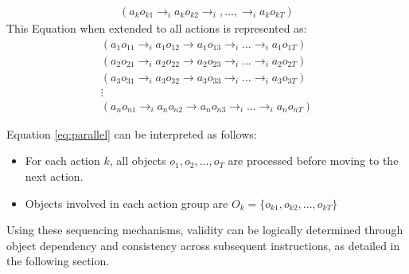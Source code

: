 \documentclass[a4paper,11pt]{lmcs}
\begin{document}
\begin{eqnarray}
 \label{eq:parallel_single}
 (a_ko_{k1} \rightarrow_i a_ko_{k2} \rightarrow_i,...,\rightarrow_i a_ko_{kT})
\end{eqnarray}
This Equation when extended to all actions is represented as:
\begin{eqnarray}
\label{eq:parallel}
(a_{1} o_{11} \rightarrow_i a_1 o_{12} \rightarrow a_1 o_{13} \rightarrow_i ... \rightarrow_i a_1 o_{1T}) \\
(a_{2} o_{21} \rightarrow_i a_2 o_{22} \rightarrow a_2 o_{23} \rightarrow_i ... \rightarrow_i a_2 o_{2T}) \nonumber \\
(a_{3} o_{31} \rightarrow_i a_3 o_{32} \rightarrow a_3 o_{33} \rightarrow_i ... \rightarrow_i a_3 o_{3T}) \nonumber \\
\vdots \nonumber \\
(a_{n} o_{n1} \rightarrow_i a_n o_{n2} \rightarrow a_n o_{n3} \rightarrow_i ... \rightarrow_i a_n o_{nT}) \nonumber
\end{eqnarray}

Equation \ref{eq:parallel} can be interpreted as follows:
\begin{itemize}
 \item For each action $k$, all objects $o_1,o_2,...,o_T$ are processed before moving to the next action.
 \item Objects involved in each action group are $O_k = \{o_{k1},o_{k2},...,o_{kT} \}$
\end{itemize}

Using these sequencing mechanisms, validity can be logically determined through object dependency and consistency across subsequent instructions, as detailed in the following section.
\end{document}
